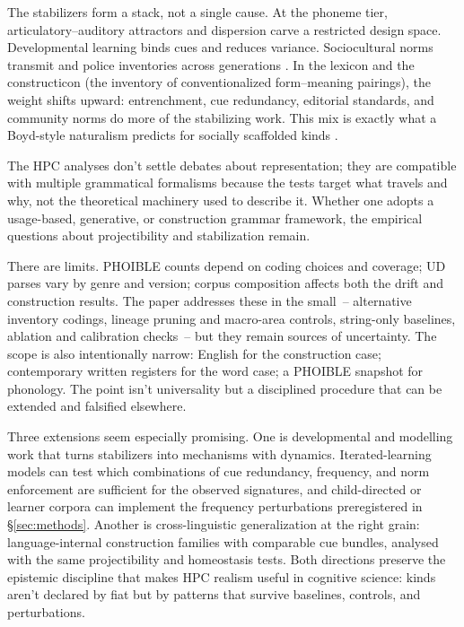 \documentclass[12pt]{article}
\begin{document}
The stabilizers form a stack, not a single cause. At the phoneme tier, articulatory–auditory attractors and dispersion carve a restricted design space. Developmental learning binds cues and reduces variance. Sociocultural norms transmit and police inventories across generations \citep{Stevens1989Quantal,LiljencrantsLindblom1972,Lindblom1990HandH,Ekstrom2025PhonemeTool}. In the lexicon and the constructicon (the inventory of conventionalized form–meaning pairings), the weight shifts upward: entrenchment, cue redundancy, editorial standards, and community norms do more of the stabilizing work. This mix is exactly what a Boyd-style naturalism predicts for socially scaffolded kinds \citep{Boyd2000Workmanship,Khalidi2013}.

The HPC analyses don't settle debates about representation; they are compatible with multiple grammatical formalisms because the tests target what travels and why, not the theoretical machinery used to describe it. Whether one adopts a usage-based, generative, or construction grammar framework, the empirical questions about projectibility and stabilization remain.

There are limits. PHOIBLE counts depend on coding choices and coverage; UD parses vary by genre and version; corpus composition affects both the drift and construction results. The paper addresses these in the small~-- alternative inventory codings, lineage pruning and macro-area controls, string-only baselines, ablation and calibration checks~-- but they remain sources of uncertainty. The scope is also intentionally narrow: English for the construction case; contemporary written registers for the word case; a PHOIBLE snapshot for phonology. The point isn't universality but a disciplined procedure that can be extended and falsified elsewhere.

Three extensions seem especially promising. One is developmental and modelling work that turns stabilizers into mechanisms with dynamics. Iterated-learning models can test which combinations of cue redundancy, frequency, and norm enforcement are sufficient for the observed signatures, and child-directed or learner corpora can implement the frequency perturbations preregistered in \S\ref{sec:methods}. Another is cross-linguistic generalization at the right grain: language-internal construction families with comparable cue bundles, analysed with the same projectibility and homeostasis tests. Both directions preserve the epistemic discipline that makes \textsc{HPC} realism useful in cognitive science: kinds aren't declared by fiat but by patterns that survive baselines, controls, and perturbations. 
\end{document}
